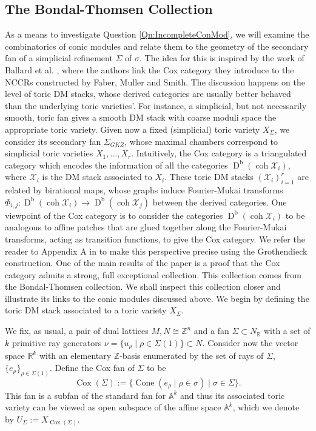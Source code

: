 \documentclass[reqno, 12pt]{amsart}
\theoremstyle{definition}
\numberwithin{equation}{section}
\newcommand{\newterm}{\textsf}
\newcommand{\dbcoh}[1]{\operatorname{D}^{\operatorname{b}}(\operatorname{coh }#1)}
\newcommand{\Z}{\mathbb{Z}}
\newcommand{\R}{\mathbb{R}}
\newcommand{\A}{\mathbb{A}}
\newcommand{\cone}{\operatorname{Cone}}
\begin{document}
\subsection{The Bondal-Thomsen Collection}


As a means to investigate Question \ref{Qn:IncompleteConMod}, we will examine the combinatorics of conic modules and relate them to the geometry of the secondary fan of a simplicial refinement $\Sigma$ of $\sigma$. The idea for this is inspired by the work of Ballard et al. \cite{BBB+}, where the authors link the \newterm{Cox category} they introduce to the NCCRs constructed by Faber, Muller and Smith. The discussion happens on the level of toric DM stacks, whose derived categories are usually better behaved than the underlying toric varieties'. For instance, a simplicial, but not necessarily smooth, toric fan gives a smooth DM stack with coarse moduli space the appropriate toric variety. Given now a fixed (simplicial) toric variety $X_\Sigma$, we consider its secondary fan $\Sigma_{GKZ}$, whose maximal chambers correspond to simplicial toric varieties $X_1,\dots,X_r$.  
Intuitively, the Cox category is a triangulated category which encodes the information of all the categories $\dbcoh{\mathcal{X}_i}$, where $\mathcal{X}_i$ is the DM stack associated to $X_i$. These toric DM stacks $(\mathcal{X}_i)_{i=1}^r$ are related by birational maps, whose graphs induce Fourier-Mukai transforms $\Phi_{i,j}:\dbcoh{\mathcal{X}_i}\rightarrow \dbcoh{\mathcal{X}_j}$ between the derived categories. One viewpoint of the Cox category is to consider the categories $\dbcoh{\mathcal{X}_i}$ to be analogous to affine patches that are glued together along the Fourier-Mukai transforms, acting as transition functions, to give the Cox category. We refer the reader to Appendix A in \cite{BBB+} to make this perspective precise using the Grothendieck construction. One of the main results of the paper \cite{BBB+} is a proof that the Cox category admits a strong, full exceptional collection. This collection comes from the \newterm{Bondal-Thomsen collection}. We shall inspect this collection closer and illustrate its links to the conic modules discussed above. We begin by defining the toric DM stack associated to a toric variety $X_\Sigma$.

We fix, as usual, a pair of dual lattices $M,N\cong \Z^n$ and a fan $\Sigma\subset N_\R$ with a set of $k$ primitive ray generators $\nu=\{u_\rho\mid \rho\in\Sigma(1)\}\subset N$. Consider now the vector space $\R^k$ with an elementary $\Z$-basis enumerated by the set of rays of $\Sigma$, $\{e_\rho\}_{\rho\in \Sigma(1)}$. Define the \newterm{Cox fan} of $\Sigma$ to be \[
\operatorname{Cox}(\Sigma):=\{\cone(e_\rho\mid\rho\in\sigma)\mid\sigma\in\Sigma\}.
\]
This fan is a subfan of the standard fan for $\A^k$ and thus its associated toric variety can be viewed as open subspace of the affine space $\A^k$, which we denote by $U_\Sigma:=X_{\operatorname{Cox}(\Sigma)}$.
\end{document}
